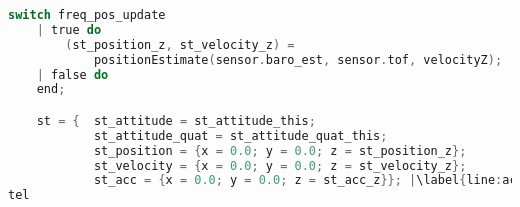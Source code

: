 \documentclass[10pt, a4paper]{article}
\begin{document}
\begin{appendices}
\begin{lstlisting}[language=C]
    switch freq_pos_update
    | true do
        (st_position_z, st_velocity_z) = 
            positionEstimate(sensor.baro_est, sensor.tof, velocityZ);
    | false do
    end;

    st = {  st_attitude = st_attitude_this;
            st_attitude_quat = st_attitude_quat_this;
            st_position = {x = 0.0; y = 0.0; z = st_position_z};
            st_velocity = {x = 0.0; y = 0.0; z = st_velocity_z};
            st_acc = {x = 0.0; y = 0.0; z = st_acc_z}}; |\label{line:acc_bug}|
tel
\end{lstlisting}
    \bigskip

\end{appendices}
\end{document}
